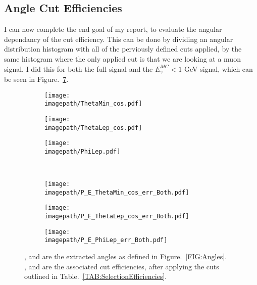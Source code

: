 \subsection{Angle Cut Efficiencies}
\label{SUBSEC:AngleCutEfficiencies}
I can now complete the end goal of my report, to evaluate the angular dependancy of the cut efficiency. This can be done by dividing an angular distribution histogram with all of the perviously defined cuts applied, by the same histogram where the only applied cut is that we are looking at a muon signal. I did this for both the full signal and the ${E}_{\gamma}^{MC} < 1$ GeV signal, which can be seen in Figure.~\ref{FIG:AngleEfficiencies}.
\\
\begin{figure}
    \begin{subfigure}[t]{0.32\textwidth}
        \texttt{[image: \\imagepath/ThetaMin\_cos.pdf]}
        \caption{}
        \label{SUBFIG:ThetaMin}
    \end{subfigure}
    \begin{subfigure}[t]{0.32\textwidth}
        \texttt{[image: \\imagepath/ThetaLep\_cos.pdf]}
        \caption{}
        \label{SUBFIG:ThetaLep}
    \end{subfigure}
    \begin{subfigure}[t]{0.32\textwidth}
        \texttt{[image: \\imagepath/PhiLep.pdf]}
        \caption{}
        \label{SUBFIG:PhiLep}
    \end{subfigure}\\
    \begin{subfigure}[t]{0.32\textwidth}
        \texttt{[image: \\imagepath/P\_E\_ThetaMin\_cos\_err\_Both.pdf]}
        \caption{}
        \label{SUBFIG:ThetaMinError}
    \end{subfigure}
    \begin{subfigure}[t]{0.32\textwidth}
        \texttt{[image: \\imagepath/P\_E\_ThetaLep\_cos\_err\_Both.pdf]}
        \caption{}
        \label{SUBFIG:ThetaLepError}
    \end{subfigure}
    \begin{subfigure}[t]{0.32\textwidth}
        \texttt{[image: \\imagepath/P\_E\_PhiLep\_err\_Both.pdf]}
        \caption{}
        \label{SUBFIG:PhiLepError}
    \end{subfigure}
    \caption{
    ,  and  are the extracted angles as defined in Figure.~\ref{FIG:Angles}. \\
    ,  and  are the associated cut efficiencies, after applying the cuts outlined in Table.~\ref{TAB:SelectionEfficiencies}.
    }
    \label{FIG:AngleEfficiencies}
\end{figure}

